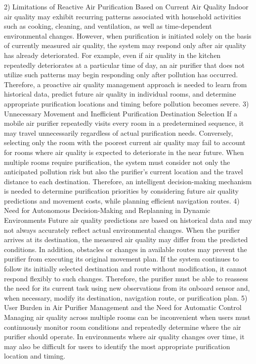2) Limitations of Reactive Air Purification Based on Current Air Quality
Indoor air quality may exhibit recurring patterns associated with household activities such as cooking, cleaning, and ventilation, as well as time-dependent environmental changes. However, when purification is initiated solely on the basis of currently measured air quality, the system may respond only after air quality has already deteriorated.
For example, even if air quality in the kitchen repeatedly deteriorates at a particular time of day, an air purifier that does not utilize such patterns may begin responding only after pollution has occurred. Therefore, a proactive air quality management approach is needed to learn from historical data, predict future air quality in individual rooms, and determine appropriate purification locations and timing before pollution becomes severe.
3) Unnecessary Movement and Inefficient Purification Destination Selection
If a mobile air purifier repeatedly visits every room in a predetermined sequence, it may travel unnecessarily regardless of actual purification needs. Conversely, selecting only the room with the poorest current air quality may fail to account for rooms where air quality is expected to deteriorate in the near future.
When multiple rooms require purification, the system must consider not only the anticipated pollution risk but also the purifier's current location and the travel distance to each destination. Therefore, an intelligent decision-making mechanism is needed to determine purification priorities by considering future air quality predictions and movement costs, while planning efficient navigation routes.
4) Need for Autonomous Decision-Making and Replanning in Dynamic Environments
Future air quality predictions are based on historical data and may not always accurately reflect actual environmental changes. When the purifier arrives at its destination, the measured air quality may differ from the predicted conditions. In addition, obstacles or changes in available routes may prevent the purifier from executing its original movement plan.
If the system continues to follow its initially selected destination and route without modification, it cannot respond flexibly to such changes. Therefore, the purifier must be able to reassess the need for its current task using new observations from its onboard sensor and, when necessary, modify its destination, navigation route, or purification plan.
5) User Burden in Air Purifier Management and the Need for Automatic Control
Managing air quality across multiple rooms can be inconvenient when users must continuously monitor room conditions and repeatedly determine where the air purifier should operate. In environments where air quality changes over time, it may also be difficult for users to identify the most appropriate purification location and timing.
